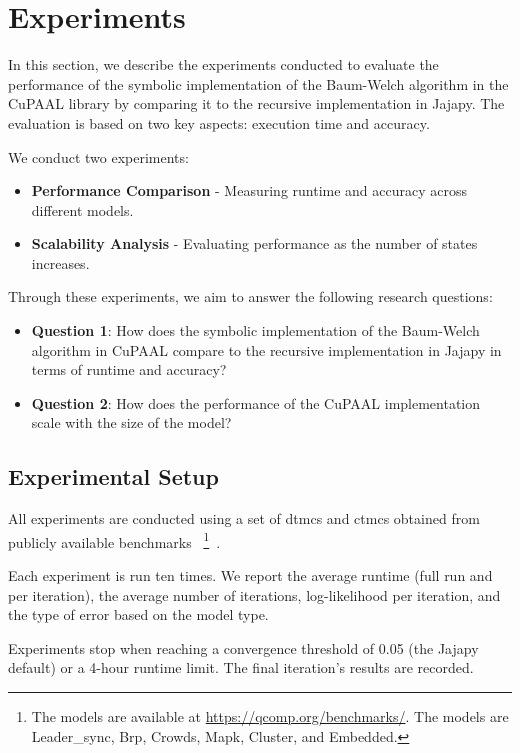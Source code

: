 \section{Experiments}\label{sec:experiments}
In this section, we describe the experiments conducted to evaluate the performance of the symbolic implementation of the Baum-Welch algorithm in the CuPAAL library by comparing it to the recursive implementation in Jajapy. The evaluation is based on two key aspects: execution time and accuracy.

We conduct two experiments:
\begin{itemize}
    \item \textbf{Performance Comparison} - Measuring runtime and accuracy across different models.
    \item \textbf{Scalability Analysis} - Evaluating performance as the number of states increases.
\end{itemize}

Through these experiments, we aim to answer the following research questions:
\begin{itemize}
    \item \textbf{Question 1}: How does the symbolic implementation of the Baum-Welch algorithm in CuPAAL compare to the recursive implementation in Jajapy in terms of runtime and accuracy?
    \item \textbf{Question 2}: How does the performance of the CuPAAL implementation scale with the size of the model?
\end{itemize}

\subsection{Experimental Setup}
All experiments are conducted using a set of \glspl{dtmc} and \glspl{ctmc} obtained from publicly available benchmarks~\cite{hartmanns2019quantitative}
\footnote{The models are available at \url{https://qcomp.org/benchmarks/}. The models are Leader\_sync, Brp, Crowds, Mapk, Cluster, and Embedded.}~\cite{hartmanns2019quantitative}.

Each experiment is run ten times.
We report the average runtime (full run and per iteration), the average number of iterations, log-likelihood per iteration, and the type of error based on the model type.

Experiments stop when reaching a convergence threshold of 0.05 (the Jajapy default) or a 4-hour runtime limit. The final iteration's results are recorded.

